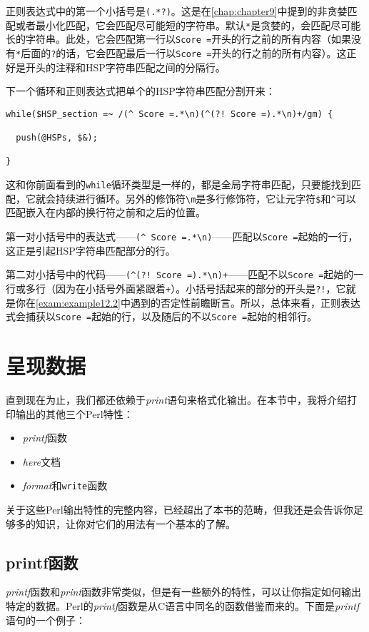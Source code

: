正则表达式中的第一个小括号是\verb|(.*?)|。这是在\autoref{chap:chapter9}中提到的非贪婪匹配或者最小化匹配，它会匹配尽可能短的字符串。默认\verb|*|是贪婪的，会匹配尽可能长的字符串。此处，它会匹配第一行以\verb|Score =|开头的行之前的所有内容（如果没有\verb|*|后面的\verb|?|的话，它会匹配最后一行以\verb|Score =|开头的行之前的所有内容）。这正好是开头的注释和HSP字符串匹配之间的分隔行。

下一个循环和正则表达式把单个的HSP字符串匹配分割开来：

\begin{lstlisting}
while($HSP_section =~ /(^ Score =.*\n)(^(?! Score =).*\n)+/gm) {
  
  push(@HSPs, $&);

}
\end{lstlisting}

这和你前面看到的\verb|while|循环类型是一样的，都是全局字符串匹配，只要能找到匹配，它就会持续进行循环。另外的修饰符\verb|\m|是多行修饰符，它让元字符\verb|$|和\verb|^|可以匹配嵌入在内部的换行符之前和之后的位置。

第一对小括号中的表达式——\verb|(^ Score =.*\n)|——匹配以\verb|Score =|起始的一行，这正是引起HSP字符串匹配部分的行。

第二对小括号中的代码——\verb|(^(?! Score =).*\n)+|——匹配不以\verb|Score =|起始的一行或多行（因为在小括号外面紧跟着\verb|+|）。小括号括起来的部分的开头是\verb|?!|，它就是你在\autoref{exam:example12.2}中遇到的否定性前瞻断言。所以，总体来看，正则表达式会捕获以\verb|Score =|起始的行，以及随后的不以\verb|Score =|起始的相邻行。

\section{呈现数据}
直到现在为止，我们都还依赖于\textit{print}语句来格式化输出。在本节中，我将介绍打印输出的其他三个Perl特性：

\begin{itemize}
  \item \textit{printf}函数
  \item \textit{here}文档
  \item \textit{format}和\verb|write|函数
\end{itemize}

关于这些Perl输出特性的完整内容，已经超出了本书的范畴，但我还是会告诉你足够多的知识，让你对它们的用法有一个基本的了解。

\subsection{printf函数}
\textit{printf}函数和\textit{print}函数非常类似，但是有一些额外的特性，可以让你指定如何输出特定的数据。Perl的\textit{printf}函数是从C语言中同名的函数借鉴而来的。下面是\textit{printf}语句的一个例子：

